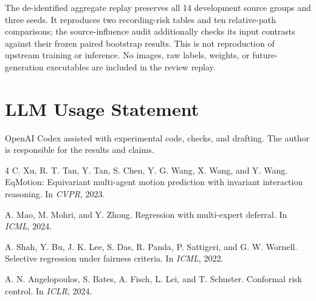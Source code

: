 \documentclass[10pt,twocolumn,letterpaper]{article}
\begin{document}
The de-identified aggregate replay preserves all 14
development source groups and three seeds. It reproduces
two recording-risk tables and ten relative-path comparisons;
the source-influence audit additionally checks its input
contrasts against their frozen paired bootstrap results.
This is not reproduction of upstream training or inference.
No images, raw labels, weights, or future-generation
executables are included in the review replay.

\section*{LLM Usage Statement}
OpenAI Codex assisted with experimental code, checks,
and drafting. The author is responsible for the results
and claims.

\begin{thebibliography}{4}
 C. Xu, R. T. Tan, Y. Tan, S. Chen, Y. G. Wang,
X. Wang, and Y. Wang. EqMotion: Equivariant multi-agent motion
prediction with invariant interaction reasoning. In \emph{CVPR}, 2023.

 A. Mao, M. Mohri, and Y. Zhong.
Regression with multi-expert deferral. In \emph{ICML}, 2024.

 A. Shah, Y. Bu, J. K. Lee, S. Das, R. Panda,
P. Sattigeri, and G. W. Wornell. Selective regression under
fairness criteria. In \emph{ICML}, 2022.

 A. N. Angelopoulos, S. Bates, A. Fisch, L. Lei,
and T. Schuster. Conformal risk control. In \emph{ICLR}, 2024.

\end{thebibliography}
\end{document}
